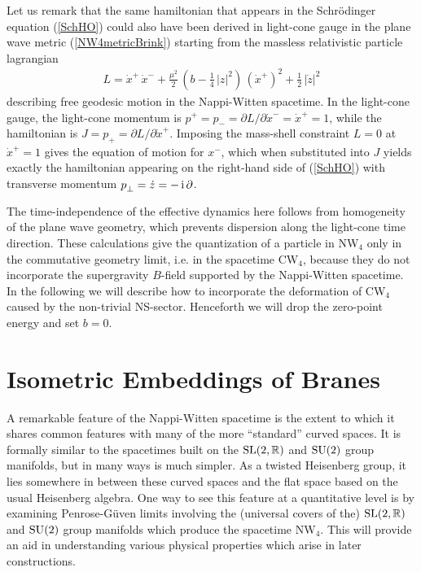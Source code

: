 \documentclass[11pt,a4paper]{article}
\newcommand{\ii}{{\rm i}}
\def\ii{{\,{\rm i}\,}}
\newcommand{\newsection}{\setcounter{equation}{0}\section}
\newcommand{\real}{{\mathbb R}} %
\newcommand{\beq}{\begin{eqnarray}}
\newcommand{\eeq}{\end{eqnarray}}
\begin{document}
Let us remark that the same hamiltonian that appears in the
Schr\"odinger equation (\ref{SchHO}) could also have been derived in
light-cone gauge in the plane wave metric (\ref{NW4metricBrink})
starting from the massless relativistic particle lagrangian
\beq
L=\dot x^+\,\dot x^-+\mbox{$\frac{\mu^2}2$}\,\left(b-\mbox{$\frac14$}\,
|z|^2\right)\,\left(\dot x^+\right)^2+\mbox{$\frac12$}\,\left|\dot z
\right|^2
\label{masslessLag}\eeq
describing free geodesic motion in the Nappi-Witten spacetime. In the
light-cone gauge, the light-cone momentum is $p^+=p_-=\partial
L/\partial\dot x^-=\dot x^+=1$, while the hamiltonian is
$J=p_+=\partial L/\partial\dot x^+$. Imposing the mass-shell
constraint $L=0$ at $\dot x^+=1$ gives the equation of motion for
$x^-$, which when substituted into $J$ yields exactly the hamiltonian
appearing on the right-hand side of (\ref{SchHO}) with transverse
momentum $p^{~}_\perp=\dot z=-\ii\partial$.

The time-independence of the effective dynamics here follows from
homogeneity of the plane wave geometry, which prevents dispersion
along the light-cone time direction. These calculations give the quantization
of a particle in NW$_4$ only in the commutative geometry limit,
i.e. in the spacetime CW$_4$, because they do not incorporate the
supergravity $B$-field supported by the Nappi-Witten spacetime. In the
following we will describe how to incorporate the deformation of
CW$_4$ caused by the non-trivial NS-sector. Henceforth we will
drop the zero-point energy and set $b=0$.

\newsection{Isometric Embeddings of Branes\label{IsomEmb}}

A remarkable feature of the Nappi-Witten spacetime is the extent to
which it shares common features with many of the more ``standard''
curved spaces. It is formally similar to the spacetimes built on the
${\rm SL}(2,\real)$ and ${\rm SU}(2)$ group manifolds, but in many
ways is much simpler. As a twisted Heisenberg group, it lies somewhere
in between these curved spaces and the flat space based on the usual
Heisenberg algebra. One way to see this feature at
a quantitative level is by examining Penrose-G\"uven limits involving the
(universal covers of the) ${\rm SL}(2,\real)$ and ${\rm SU}(2)$ group
manifolds which produce the spacetime NW$_4$. This will provide an aid
in understanding various physical properties which arise in later
constructions.
\end{document}
